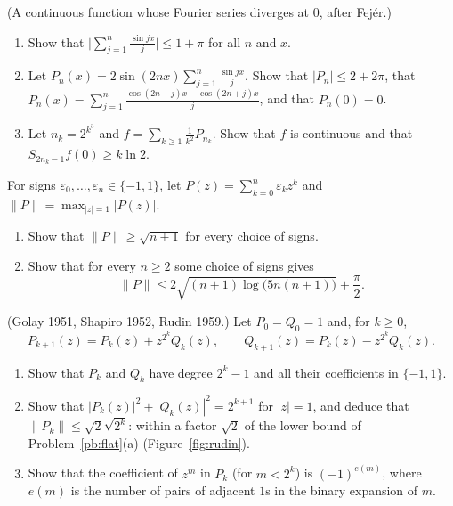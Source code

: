 \begin{exercise}[$\star\star\star$]\label{ex:divergent}
(A continuous function whose Fourier series diverges at $0$, after Fej\'er.)
\begin{enumerate}[label=(\alph*)]
\item Show that $\bigl|\sum_{j=1}^n\frac{\sin jx}j\bigr|\le1+\pi$ for all $n$ and $x$.
\item Let $P_n(x)=2\sin(2nx)\sum_{j=1}^n\frac{\sin jx}j$. Show that $|P_n|\le2+2\pi$, that $P_n(x)=\sum_{j=1}^n\frac{\cos(2n-j)x-\cos(2n+j)x}j$, and that $P_n(0)=0$.
\item Let $n_k=2^{k^3}$ and $f=\sum_{k\ge1}\frac1{k^2}P_{n_k}$. Show that $f$ is continuous and that $S_{2n_k-1}f(0)\ge k\ln2$.
\end{enumerate}
\end{exercise}

\begin{exercise}[$\star\star\star$]\label{pb:flat}
For signs $\varepsilon_0,\dots,\varepsilon_n\in\{-1,1\}$, let $P(z)=\sum_{k=0}^n\varepsilon_kz^k$ and
$\|P\|=\max_{|z|=1}|P(z)|$.
\begin{enumerate}[label=(\alph*)]
\item Show that $\|P\|\ge\sqrt{n+1}$ for every choice of signs.
\item Show that for every $n\ge2$ some choice of signs gives
\[
\|P\|\le2\sqrt{(n+1)\log\bigl(5n(n+1)\bigr)}+\frac\pi2.
\]
\end{enumerate}
\end{exercise}

\begin{exercise}[$\star\star$]\label{pb:rudin}
(Golay 1951, Shapiro 1952, Rudin 1959.) Let $P_0=Q_0=1$ and, for $k\ge0$,
\[
P_{k+1}(z)=P_k(z)+z^{2^k}Q_k(z),\qquad Q_{k+1}(z)=P_k(z)-z^{2^k}Q_k(z).
\]
\begin{enumerate}[label=(\alph*)]
\item Show that $P_k$ and $Q_k$ have degree $2^k-1$ and all their coefficients in $\{-1,1\}$.
\item Show that $|P_k(z)|^2+|Q_k(z)|^2=2^{k+1}$ for $|z|=1$, and deduce that $\|P_k\|\le\sqrt2\sqrt{2^k}$: within a factor
$\sqrt2$ of the lower bound of Problem~\ref{pb:flat}(a) (Figure~\ref{fig:rudin}).
\item Show that the coefficient of $z^m$ in $P_k$ (for $m<2^k$) is $(-1)^{e(m)}$, where $e(m)$ is the number of pairs of
adjacent $1$s in the binary expansion of $m$.
\end{enumerate}
\end{exercise}

